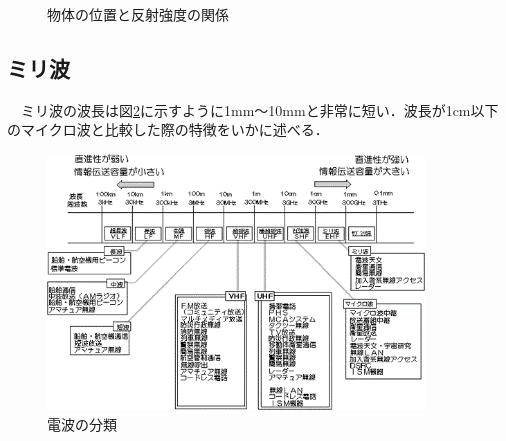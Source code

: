\begin{figure}
	\caption{物体の位置と反射強度の関係}
	\label{fig:RADAR_Demo}
\end{figure}


\subsection{ミリ波}
　ミリ波の波長は図\ref{fig:ClassificationOfRadioWaves}に示すように1mm～10mmと非常に短い．波長が1cm以下のマイクロ波と比較した際の特徴をいかに述べる\cite{feature_RadioWaves}．

\begin{figure}[H]
    \centering
    \includegraphics[width=10cm]{./fig/ClassificationOfRadioWaves.png}
    \caption{電波の分類\cite{soumu_RadioWaves}}
    \label{fig:ClassificationOfRadioWaves}
\end{figure}

